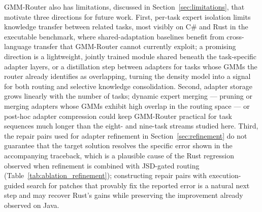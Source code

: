 GMM-Router also has limitations, discussed in Section~\ref{sec:limitations}, that motivate three directions for future work. First, per-task expert isolation limits knowledge transfer between related tasks, most visibly on C\# and Rust in the executable benchmark, where shared-adaptation baselines benefit from cross-language transfer that GMM-Router cannot currently exploit; a promising direction is a lightweight, jointly trained module shared beneath the task-specific adapter layers, or a distillation step between adapters for tasks whose GMMs the router already identifies as overlapping, turning the density model into a signal for both routing and selective knowledge consolidation. Second, adapter storage grows linearly with the number of tasks; dynamic expert merging --- pruning or merging adapters whose GMMs exhibit high overlap in the routing space --- or post-hoc adapter compression could keep GMM-Router practical for task sequences much longer than the eight- and nine-task streams studied here. Third, the repair pairs used for adapter refinement in Section~\ref{sec:refinement} do not guarantee that the target solution resolves the specific error shown in the accompanying traceback, which is a plausible cause of the Rust regression observed when refinement is combined with JSD-gated routing (Table~\ref{tab:ablation_refinement}); constructing repair pairs with execution-guided search for patches that provably fix the reported error is a natural next step and may recover Rust's gains while preserving the improvement already observed on Java.
